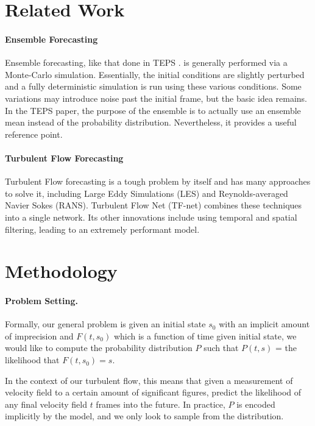\documentclass{article}
\begin{document}
\section{Related Work}

\paragraph{Ensemble Forecasting} Ensemble forecasting, like that done in TEPS \cite{TyphoonEnsemblePredictionSystemDevelopedattheJapanMeteorologicalAgency}. is generally performed via a Monte-Carlo simulation. Essentially, the initial conditions are slightly perturbed and a fully deterministic simulation is run using these various conditions. Some variations may introduce noise past the initial frame, but the basic idea remains. In the TEPS paper, the purpose of the ensemble is to actually use an ensemble mean instead of the probability distribution. Nevertheless, it provides a useful reference point.

\paragraph{Turbulent Flow Forecasting} Turbulent Flow forecasting is a tough problem by itself and has many approaches to solve it, including Large Eddy Simulations (LES) and Reynolds-averaged Navier Sokes (RANS). Turbulent Flow Net (TF-net) \cite{Wang2020TF} combines these techniques into a single network. Its other innovations include using temporal and spatial filtering, leading to an extremely performant model.

\section{Methodology}

\paragraph{Problem Setting.}
Formally, our general problem is given an initial state $s_0$ with an implicit amount of imprecision and $F(t, s_0)$ which is a function of time given initial state, we would like to compute the probability distribution $P$ such that $P(t,s)$ = the likelihood that $F(t,s_0) = s$.

In the context of our turbulent flow, this means that given a measurement of velocity field to a certain amount of significant figures, predict the likelihood of any final velocity field $t$ frames into the future. In practice, $P$ is encoded implicitly by the model, and we only look to sample from the distribution.
\end{document}

